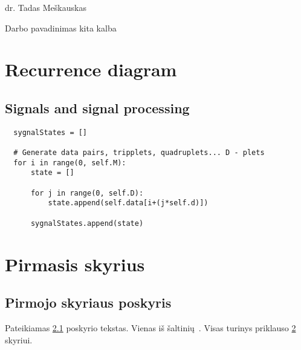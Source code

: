 \documentclass[a4paper,12pt,fleqn]{article}
\begin{document}
 {}{}{}{}%
 {dr. Tadas Meškauskas}

\tableofcontents



\bothabstracts{}%
{Darbo pavadinimas kita kalba} %
{}%






\newpage

\section{Recurrence diagram}
\label{sec:motivation}

\subsection{Signals and signal processing}

\begin{lstlisting}
  sygnalStates = []

  # Generate data pairs, tripplets, quadruplets... D - plets
  for i in range(0, self.M):
      state = []

      for j in range(0, self.D):
          state.append(self.data[i+(j*self.d)])

      sygnalStates.append(state)
\end{lstlisting}
%
%


\section{Pirmasis skyrius}
\label{sec:motivation}
\subsection{Pirmojo skyriaus poskyris}
\label{sec:example}
Pateikiamas \ref{sec:example} poskyrio tekstas. Vienas iš šaltinių~\cite{KTZ}. Visas turinys priklauso \ref{sec:motivation} skyriui.
\end{document}
